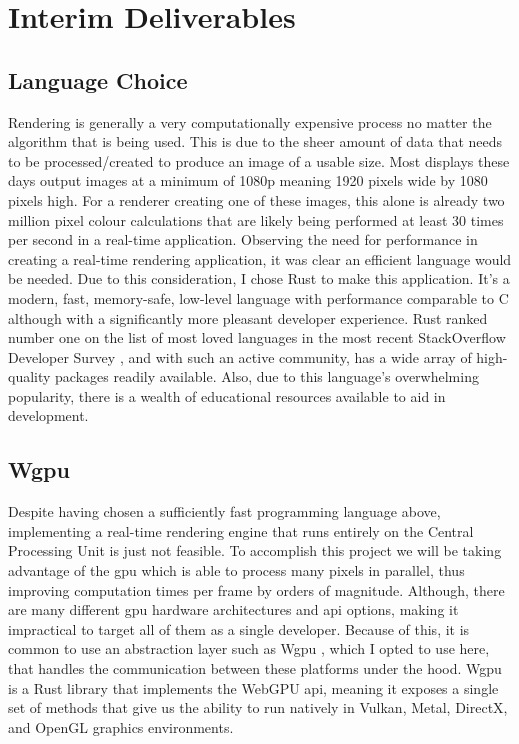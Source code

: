 \documentclass[titlepage]{article}
\begin{document}
\section{Interim Deliverables}
\subsection{Language Choice}
Rendering is generally a very computationally expensive process no matter the algorithm that is being used. This is due to the sheer amount of data that needs to be processed/created to produce an image of a usable size. Most displays these days output images at a minimum of 1080p meaning 1920 pixels wide by 1080 pixels high. For a renderer creating one of these images, this alone is already two million pixel colour calculations that are likely being performed at least 30 times per second in a real-time application. Observing the need for performance in creating a real-time rendering application, it was clear an efficient language would be needed. Due to this consideration, I chose Rust to make this application. It's a modern, fast, memory-safe, low-level language with performance comparable to C although with a significantly more pleasant developer experience. Rust ranked number one on the list of most loved languages in the most recent StackOverflow Developer Survey \cite{survey}, and with such an active community, has a wide array of high-quality packages readily available. Also, due to this language's overwhelming popularity, there is a wealth of educational resources available to aid in development.

\subsection{Wgpu}
Despite having chosen a sufficiently fast programming language above, implementing a real-time rendering engine that runs entirely on the Central Processing Unit is just not feasible. To accomplish this project we will be taking advantage of the \acrfull{gpu} which is able to process many pixels in parallel, thus improving computation times per frame by orders of magnitude. Although, there are many different \acrshort{gpu} hardware architectures and \acrfull{api} options, making it impractical to target all of them as a single developer. Because of this, it is common to use an abstraction layer such as Wgpu \cite{wgpu:source}, which I opted to use here, that handles the communication between these platforms under the hood. Wgpu is a Rust library that implements the WebGPU \cite{webgpu} \acrshort{api}, meaning it exposes a single set of methods that give us the ability to run natively in Vulkan, Metal, DirectX, and OpenGL graphics environments.
\end{document}
